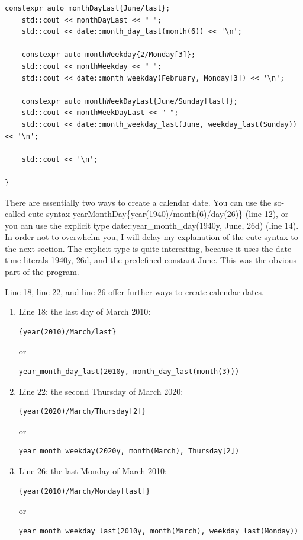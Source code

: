 \begin{lstlisting}[style=styleCXX]
	constexpr auto monthDayLast{June/last};
	std::cout << monthDayLast << " ";
	std::cout << date::month_day_last(month(6)) << '\n';
	
	constexpr auto monthWeekday{2/Monday[3]};
	std::cout << monthWeekday << " ";
	std::cout << date::month_weekday(February, Monday[3]) << '\n';
	
	constexpr auto monthWeekDayLast{June/Sunday[last]};
	std::cout << monthWeekDayLast << " ";
	std::cout << date::month_weekday_last(June, weekday_last(Sunday)) << '\n';
	
	std::cout << '\n';

}
\end{lstlisting}

There are essentially two ways to create a calendar date. You can use the so-called cute syntax yearMonthDay\{year(1940)/month(6)/day(26)\} (line 12), or you can use the explicit type date::year\_month\_day(1940y, June, 26d) (line 14). In order not to overwhelm you, I will delay my explanation of the cute syntax to the next section. The explicit type is quite interesting, because it uses the date-time literals 1940y, 26d, and the predefined constant June. This was the obvious part of the program.

Line 18, line 22, and line 26 offer further ways to create calendar dates.

\begin{enumerate}
\item 
Line 18: the last day of March 2010: 
\begin{lstlisting}[style=styleCXX]
{year(2010)/March/last}
\end{lstlisting}
or
\begin{lstlisting}[style=styleCXX]
year_month_day_last(2010y, month_day_last(month(3)))
\end{lstlisting}

\item 
Line 22: the second Thursday of March 2020:
\begin{lstlisting}[style=styleCXX]
{year(2020)/March/Thursday[2]}
\end{lstlisting}
or
\begin{lstlisting}[style=styleCXX]
year_month_weekday(2020y, month(March), Thursday[2])
\end{lstlisting}

\item 
Line 26: the last Monday of March 2010: 
\begin{lstlisting}[style=styleCXX]
{year(2010)/March/Monday[last]}
\end{lstlisting}
or
\begin{lstlisting}[style=styleCXX]
year_month_weekday_last(2010y, month(March), weekday_last(Monday))
\end{lstlisting}
\end{enumerate}

